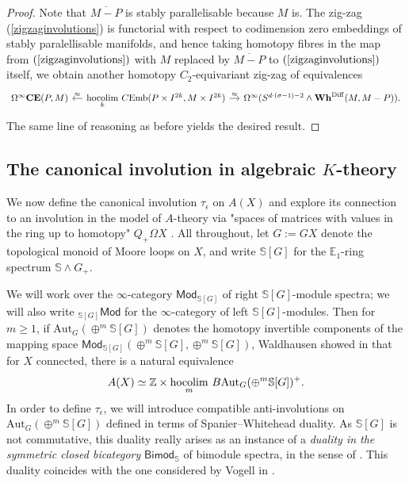 \documentclass[a4paper, oneside]{amsart}
\DeclareMathOperator{\hocolim}{\operatorname{hocolim}}
\newcommand{\diff}{\mathrm{Diff}}
\newcommand{\cemb}{C\mathrm{Emb}}
\newcommand{\1}{\mathds{1}}
\theoremstyle{remark}
\theoremstyle{definition}
\newcommand{\Z}{{\scaleobj{0.97}{\mathbb{Z}}}}
\newcommand{\s}{\mathbb{S}}
\newcommand{\CEsp}{\mathbf{CE}}
\newcommand{\Whsp}{\mathbf{Wh}^{\diff}}
\numberwithin{equation}{section}
\begin{document}
\begin{proof}
    Note that $\overline{M-P}$ is stably parallelisable because $M$ is. The zig-zag (\ref{zigzaginvolutions}) is functorial with respect to codimension zero embeddings of stably paralellisable manifolds, and hence taking homotopy fibres in the map from $(\ref{zigzaginvolutions})$ with $M$ replaced by $\overline{M-P}$ to $(\ref{zigzaginvolutions})$ itself, we obtain another homotopy $C_2$-equivariant zig-zag of equivalences
    $$
\begin{tikzcd}[column sep = 11pt]    \Omega^\infty\CEsp(P,M)&\lar["\approx"']\underset{k}{\hocolim}\ \cemb(P\times I^{2k}, M\times I^{2k})\rar["\approx"] &\Omega^\infty(S^{d\cdot(\sigma-1)-2}\wedge\Whsp(M,M-P)).
    \end{tikzcd}
    $$
The same line of reasoning as before yields the desired result.
\end{proof}









\subsection{The canonical involution in algebraic $K$-theory}\label{canonicalinvsection} We now define the canonical involution $\tau_\epsilon$ on $A(X)$ and explore its connection to an involution in the model of $A$-theory via "spaces of matrices with values in the ring up to homotopy" $Q_+\Omega X$ \cite[\S 2.2]{WaldhausenAtheory}. All throughout, let $G:=GX$ denote the topological monoid of Moore loops on $X$, and write $\s[G]$ for the $\mathbb{E}_1$-ring spectrum $\s\wedge G_+$.

We will work over the $\infty$-category $\mathsf{Mod}_{\s[G]}$ of right $\s[G]$-module spectra; we will also write $_{\s[G]}\mathsf{Mod}$ for the $\infty$-category of left $\s[G]$-modules. Then for $m\geq 1$, if $\mathrm{Aut}_G(\oplus^{m}\s[G])$ denotes the homotopy invertible components of the mapping space $\mathsf{Mod}_{\s[G]}(\oplus^m\s[G],\oplus^m\s[G])$, Waldhausen showed in \cite[Thm. 2.2.1]{WaldhausenAtheory} that for $X$ connected, there is a natural equivalence 
\begin{equation}\label{BweirdHeq}
A(X)\simeq \Z\times\underset{m}{\hocolim}\ B\mathrm{Aut}_G(\oplus^m \s[G])^+.
\end{equation}
In order to define $\tau_\epsilon$, we will introduce compatible anti-involutions on $\mathrm{Aut}_G(\oplus^{m}\s[G])$ defined in terms of Spanier--Whitehead duality. As $\s[G]$ is not commutative, this duality really arises as an instance of a \textit{duality in the symmetric closed bicategory} $\mathsf{Bimod}_\s$ of bimodule spectra, in the sense of \cite[\S 16.4]{MaySigurdsson}. This duality coincides with the one considered by Vogell in \cite[\S 1]{VogellInvolution}.
\end{document}
